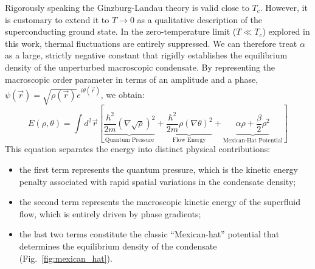 \documentclass[english,binding=0.6cm,noexaminfo]{sapthesis}
\begin{document}
Rigorously speaking the Ginzburg-Landau theory is valid close to $T_c$. However, it is customary to extend it to $T\rightarrow0$ as a qualitative description of the superconducting ground state. In the zero-temperature limit ($T \ll T_c$) explored in this work, thermal fluctuations are entirely suppressed. We can therefore treat $\alpha$ as a large, strictly negative constant that rigidly establishes the equilibrium density of the unperturbed macroscopic condensate. By representing the macroscopic order parameter in terms of an amplitude and a phase, $\psi(\vec{r}) = \sqrt{\rho(\vec{r})} e^{i\theta(\vec{r})}$, we obtain:
\begin{equation}
    E(\rho, \theta) = \int d^2\vec{r} \left[ \underbrace{\frac{\hbar^2}{2m}(\nabla\sqrt{\rho})^2}_{\text{Quantum Pressure}} + \underbrace{\frac{\hbar^2}{2m}\rho(\nabla\theta)^2}_{\text{Flow Energy}} + \underbrace{\alpha\rho + \frac{\beta}{2}\rho^2}_{\text{Mexican-Hat Potential}} \right]
\end{equation}
This equation separates the energy into distinct physical contributions:
\begin{itemize}
    \item [-] the first term represents the quantum pressure, which is the kinetic energy penalty associated with rapid spatial variations in the condensate density;
    \item[-] the second term represents the macroscopic kinetic energy of the superfluid flow, which is entirely driven by phase gradients;
    \item[-] the last two terms constitute the classic ``Mexican-hat'' potential that determines the equilibrium density of the condensate (Fig.~\ref{fig:mexican_hat}).
\end{itemize}
\end{document}
